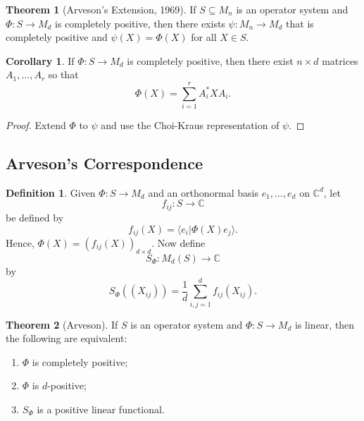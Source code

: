 \documentclass[12pt]{article}
\theoremstyle{definition}
\newtheorem*{theorem}{Theorem}
\newtheorem*{corollary}{Corollary}
\newtheorem*{definition}{Definition}
\newcommand{\C}{\mathbb{C}}
\begin{document}
\begin{theorem}[Arveson's Extension, 1969]
If $S \subseteq M_n$ is an operator system and $\Phi:S \to M_d$ is completely positive, then there exists $\psi:M_n \to M_d$ that is completely positive and $\psi(X)=\Phi(X)$ for all $X \in S$.
\end{theorem}

\begin{corollary}
If $\Phi:S \to M_d$ is completely positive, then there exist $n \times d$ matrices $A_1,\ldots,A_r$ so that
\[
\Phi(X)=\sum_{i=1}^r A_i^*XA_i.
\]
\end{corollary}

\begin{proof}
Extend $\Phi$ to $\psi$ and use the Choi-Kraus representation of $\psi$.
\end{proof}

\subsection{Arveson's Correspondence}

\begin{definition}
Given $\Phi:S \to M_d$ and an orthonormal basis $e_1,\ldots,e_d$ on $\C^d$, let
\[
f_{ij}:S \to \C
\]
be defined by
\[
f_{ij}(X)=\langle e_i|\Phi(X)e_j\rangle.
\]
Hence, $\Phi(X)=(f_{ij}(X))_{d \times d}$. Now define
\[
S_\Phi:M_d(S) \to \C
\]
by
\[
S_\Phi((X_{ij}))=\frac{1}{d}\sum_{i,j=1}^d f_{ij}(X_{ij}).
\]
\end{definition}

\begin{theorem}[Arveson]
If $S$ is an operator system and $\Phi:S \to M_d$ is linear, then the following are equivalent:
\begin{enumerate}
\item $\Phi$ is completely positive;
\item $\Phi$ is $d$-positive;
\item $S_\Phi$ is a positive linear functional.
\end{enumerate}
\end{theorem}
\end{document}

